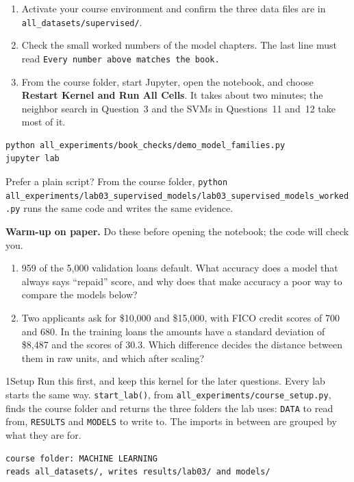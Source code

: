 \begin{labmode}
\begin{enumerate}
  \item Activate your course environment and confirm the three data files are in \texttt{all\_datasets/\allowbreak supervised/}.
  \item Check the small worked numbers of the model chapters. The last line must read \texttt{Every number above matches the book.}
  \item From the course folder, start Jupyter, open the notebook, and choose \textbf{Restart Kernel and Run All Cells}. It takes about two minutes; the neighbor search in Question~3 and the SVMs in Questions~11 and~12 take most of it.
\end{enumerate}
\begin{lstlisting}[style=utpterminal]
python all_experiments/book_checks/demo_model_families.py
jupyter lab
\end{lstlisting}
Prefer a plain script? From the course folder, \texttt{python all\_experiments/\allowbreak lab03\_supervised\_models/\allowbreak lab03\_supervised\_models\_worked.py} runs the same code and writes the same evidence.
\end{labmode}

\labroutine

\begin{yourturn}
\textbf{Warm-up on paper.} Do these before opening the notebook; the code will check you.
\begin{enumerate}
  \item 959 of the 5,000 validation loans default. What accuracy does a model that always says ``repaid'' score, and why does that make accuracy a poor way to compare the models below?
  \item Two applicants ask for \$10,000 and \$15,000, with FICO credit scores of 700 and 680. In the training loans the amounts have a standard deviation of \$8,487 and the scores of 30.3. Which difference decides the distance between them in raw units, and which after scaling?
\end{enumerate}
\end{yourturn}

\begin{labquestion}{1}{Setup}
Run this first, and keep this kernel for the later questions. Every lab starts the same way. \texttt{start\_lab()}, from \texttt{all\_experiments/\allowbreak course\_setup.py}, finds the course folder and returns the three folders the lab uses: \texttt{DATA} to read from, \texttt{RESULTS} and \texttt{MODELS} to write to. The imports in between are grouped by what they are for.
\end{labquestion}
\begin{labanswer}

\begin{refoutput}
\begin{lstlisting}[style=utpterminal]
course folder: MACHINE LEARNING
reads all_datasets/, writes results/lab03/ and models/
\end{lstlisting}
\end{refoutput}
\end{labanswer}

